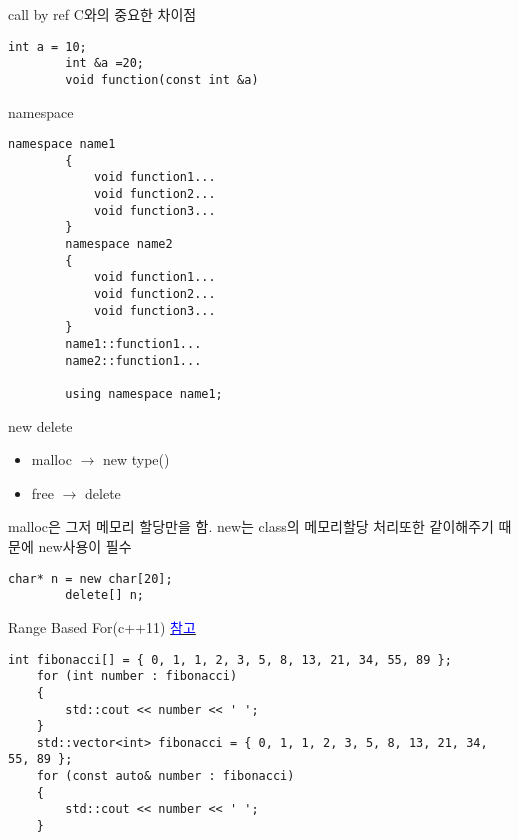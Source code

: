 \documentclass[10pt]{beamer}
\begin{document}

\begin{frame}[fragile]{call by ref}
    C와의 중요한 차이점
    \begin{lstlisting}[style = CStyle]
        int a = 10;
        int &a =20;
        void function(const int &a)
    \end{lstlisting}
\end{frame}



\begin{frame}[fragile]{namespace}
    \begin{lstlisting}[style = CStyle]
        namespace name1
        {
            void function1...
            void function2...
            void function3...
        }
        namespace name2
        {
            void function1...
            void function2...
            void function3...
        }
        name1::function1...
        name2::function1...

        using namespace name1;
    \end{lstlisting}
\end{frame}



\begin{frame}[fragile]{new delete}
    \begin{itemize}
        \item malloc $\rightarrow$ new type()
        \item free $\rightarrow$ delete 
    \end{itemize}
    malloc은 그저 메모리 할당만을 함. new는 class의 메모리할당 처리또한 같이해주기 때문에 new사용이 필수
    \begin{lstlisting}[style = CStyle]
        char* n = new char[20];
        delete[] n;
    \end{lstlisting}
\end{frame}


\begin{frame}[fragile]{Range Based For(c++11)}
    \href{https://www.youtube.com/watch?v=sVoz36DYK5s&list=PLW_uvsSPlijtSmrhajc3Y02G86lOieQOb}{\textcolor{blue}{참고}}
    
    \begin{lstlisting}[style = CStyle]
    int fibonacci[] = { 0, 1, 1, 2, 3, 5, 8, 13, 21, 34, 55, 89 }; 
    for (int number : fibonacci)
    {
        std::cout << number << ' ';
    }
    std::vector<int> fibonacci = { 0, 1, 1, 2, 3, 5, 8, 13, 21, 34, 55, 89 }; 
    for (const auto& number : fibonacci) 
    {
        std::cout << number << ' ';
    }
    \end{lstlisting}

\end{frame}    
\end{document}
